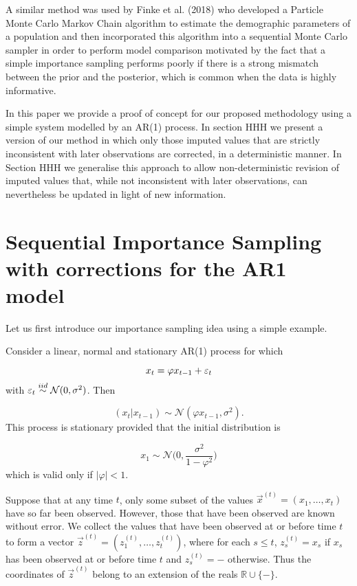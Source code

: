 A similar method was used by Finke et al. (2018) who developed a Particle Monte Carlo Markov Chain algorithm to estimate the demographic parameters of a population and then incorporated this algorithm into a sequential Monte Carlo sampler in order to perform model comparison motivated by the fact that a simple importance sampling performs poorly if there is a strong mismatch between the prior and the posterior, which is common when the data is highly informative.

In this paper we provide a proof of concept for our proposed methodology using a simple system modelled by an AR(1) process. In section HHH we present a version of our method in which only those imputed values that are strictly inconsistent with later observations are corrected, in a deterministic manner. In Section HHH we generalise this approach to allow non-deterministic revision of imputed values that, while not inconsistent with later observations, can nevertheless be updated in light of new information.

\section{Sequential Importance Sampling with corrections for the AR1 model}

Let us first introduce our importance sampling idea using a simple example.

Consider a linear, normal and stationary AR(1) process for which

\[
x_{t} = \varphi x_{t-1} + \varepsilon_{t}
\]
with $\varepsilon_{t} \stackrel{iid}{\sim} \mathcal{N}(0, \sigma^{2})$.
Then

\[
(x_{t} | x_{t-1}) \sim \mathcal{N} (\varphi x_{t-1}, \sigma^{2}).
\]
This process is stationary provided that the initial distribution is

\[
x_{1} \sim \mathcal{N} \Bigg (0, \frac{\sigma^2}{1- \varphi^2} \Bigg )
\]
which is valid only if $|\varphi| < 1$.

Suppose that at any time $t$, only some subset of the values $\vec {x}^{(t)} = (x_1, \dots, x_{t})$ have so far been observed. However, those that have been observed are known without error. We collect the values that have been observed at or before time $t$ to form a vector $\vec{z}^{(t)} = (z_1^{(t)}, \dots, z_{t}^{(t)})$, where for each $s \leq t$, $z_s^{(t)} = x_s$ if $x_s$ has been observed at or before time $t$ and $z_s^{(t)} = -$ otherwise. Thus the coordinates of $\vec{z}^{(t)}$ belong to an extension of the reals $\mathbb{R} \cup \{ - \}$.


